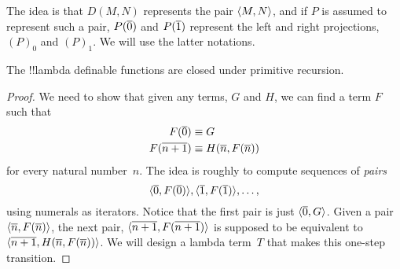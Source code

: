 \documentclass[../../../include/open-logic-section]{subfiles}
\begin{document}
The idea is that $D(M,N)$ represents the pair $\langle M, N \rangle$, and if
$P$ is assumed to represent such a pair, $P(\overline{0})$ and $P(\overline{1})$
represent the left and right projections, $(P)_0$ and $(P)_1$. We will
use the latter notations.

\begin{lem}
The !!{lambda definable} functions are closed under primitive recursion.
\end{lem}

\begin{proof}
We need to show that given any terms, $G$ and $H$, we can find a term
$F$ such that
\begin{align*}
F(\num{0}) & \equiv G \\
F(\num{n+1}) & \equiv H(\num{n}, F(\num{n}))
\end{align*}
for every natural number~$n$. The idea is roughly to compute sequences
of \emph{pairs}
\[
\langle \overline{0}, F(\overline{0}) \rangle, \langle \overline{1}, F(\overline{1}) \rangle, \dots,
\]
using numerals as iterators. Notice that the first pair is just
$\langle \overline{0}, G \rangle$. Given a pair $\langle \overline{n}, F(\overline{n}) \rangle$, the
next pair, $\langle \overline{n+1}, F(\overline{n+1}) \rangle$ is supposed to
be equivalent to $\langle \overline{n+1}, H(\overline{n}, F(\overline{n})) \rangle$. We
will design a lambda term~$T$ that makes this one-step transition.


\end{proof}
\end{document}
